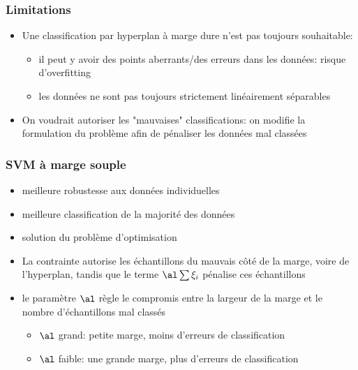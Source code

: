 \documentclass[9pt,table]{beamer} %
\begin{document}
\begin{frame}
\frametitle{Limitations}

\begin{itemize}[label=\tiny$\blacksquare$]
	\item Une classification par hyperplan à marge dure n'est pas toujours souhaitable:
	\begin{itemize}[label=-]
		\item il peut y avoir des points aberrants/des erreurs dans les données: risque d'\alert{overfitting}
		\item les données ne sont pas toujours strictement linéairement séparables
	\end{itemize}
	
		
	
	\pause
	
	\item On voudrait autoriser les "mauvaises" classifications: on modifie la formulation du problème afin de \alert{pénaliser} les données mal classées
\end{itemize}

\end{frame}


\begin{frame}
\frametitle{SVM à marge souple}

\begin{itemize}[label=\tiny$\blacksquare$]
	\item meilleure robustesse aux données individuelles
	
	\item meilleure classification de \alert{la majorité} des données
	
	\item solution du problème d'optimisation
	
	\item La contrainte
	autorise les échantillons du mauvais côté de la marge, voire de l'hyperplan, tandis que le terme $\al \sum \xi_i$ pénalise ces échantillons
	
	\item le paramètre $\al$ règle le compromis entre la largeur de la marge et le nombre d'échantillons mal classés
		\begin{itemize}[label=-]
			\item $\al$ grand: petite marge, moins d'erreurs de classification
			\item $\al$ faible: une grande marge, plus d'erreurs de classification 
		\end{itemize}
\end{itemize}
\end{frame}
\end{document}
